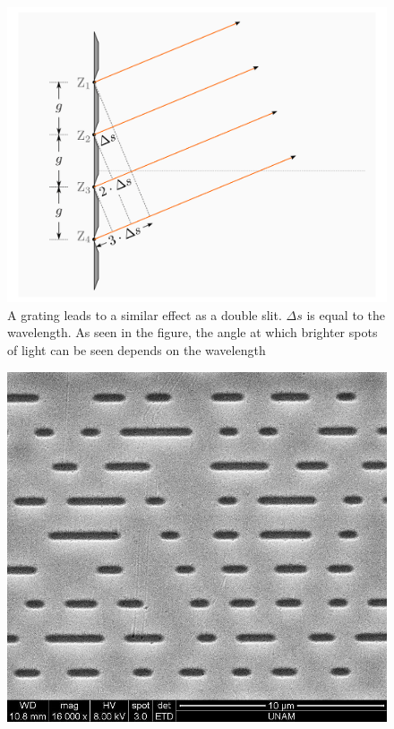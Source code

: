     \begin{minipage}{0.99\linewidth}
        \begin{minipage}{0.7\linewidth}
            \begin{figure}[H]
                \centering
                \includegraphics[scale = 0.25]{src/images/interference_grating.png}
                \caption{A grating leads to a similar effect as a double slit.
                $\Delta s$ is equal to the wavelength.
                As seen in the figure, the angle at which brighter spots of light can be seen depends on the wavelength}
                \label{fig_grating}
            \end{figure}
        \end{minipage}
        \begin{minipage}{0.25\linewidth}
          \begin{scriptsize}
            \begin{center}
                \begin{figure}[H]
                    \centering
                    \includegraphics[scale = 0.15]{src/images/lands_pits_cd.png}

\end{figure}
\end{center}
\end{scriptsize}
\end{minipage}
\end{minipage}
